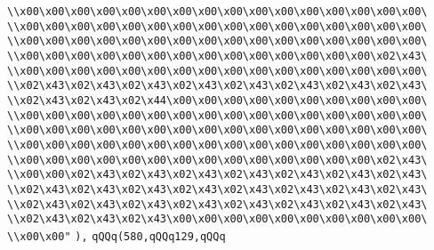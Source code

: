 \verb|\\x00\x00\x00\x00\x00\x00\x00\x00\x00\x00\x00\x00\x00\x00\x00\x00\|\newline
\verb|\\x00\x00\x00\x00\x00\x00\x00\x00\x00\x00\x00\x00\x00\x00\x00\x00\|\newline
\verb|\\x00\x00\x00\x00\x00\x00\x00\x00\x00\x00\x00\x00\x00\x00\x00\x00\|\newline
\verb|\\x00\x00\x00\x00\x00\x00\x00\x00\x00\x00\x00\x00\x00\x00\x02\x43\|\newline
\verb|\\x00\x00\x00\x00\x00\x00\x00\x00\x00\x00\x00\x00\x00\x00\x00\x00\|\newline
\verb|\\x02\x43\x02\x43\x02\x43\x02\x43\x02\x43\x02\x43\x02\x43\x02\x43\|\newline
\verb|\\x02\x43\x02\x43\x02\x44\x00\x00\x00\x00\x00\x00\x00\x00\x00\x00\|\newline
\verb|\\x00\x00\x00\x00\x00\x00\x00\x00\x00\x00\x00\x00\x00\x00\x00\x00\|\newline
\verb|\\x00\x00\x00\x00\x00\x00\x00\x00\x00\x00\x00\x00\x00\x00\x00\x00\|\newline
\verb|\\x00\x00\x00\x00\x00\x00\x00\x00\x00\x00\x00\x00\x00\x00\x00\x00\|\newline
\verb|\\x00\x00\x00\x00\x00\x00\x00\x00\x00\x00\x00\x00\x00\x00\x02\x43\|\newline
\verb|\\x00\x00\x02\x43\x02\x43\x02\x43\x02\x43\x02\x43\x02\x43\x02\x43\|\newline
\verb|\\x02\x43\x02\x43\x02\x43\x02\x43\x02\x43\x02\x43\x02\x43\x02\x43\|\newline
\verb|\\x02\x43\x02\x43\x02\x43\x02\x43\x02\x43\x02\x43\x02\x43\x02\x43\|\newline
\verb|\\x02\x43\x02\x43\x02\x43\x00\x00\x00\x00\x00\x00\x00\x00\x00\x00\|\newline
\verb|\\x00\x00"|\newline
\verb|),|\newline
\verb|qQQq(580,qQQq129,qQQq|\newline
